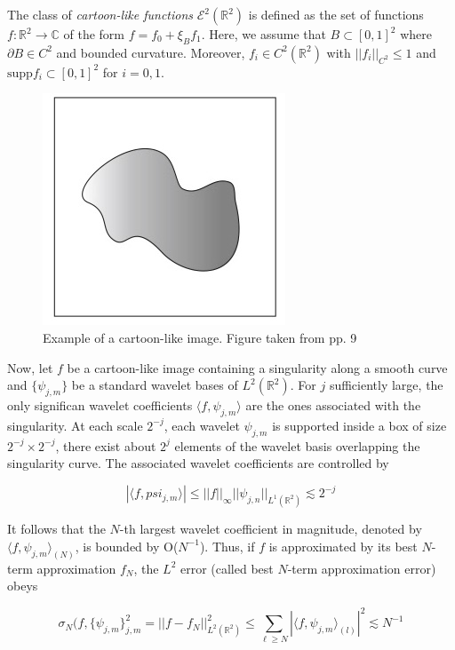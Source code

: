 \bigskip

\begin{defn}
The class of \textit{cartoon-like functions} $\mathcal{E}^2(\mathbb{R}^2)$ is defined as the set of functions $f:\mathbb{R}^2\longrightarrow \mathbb{C}$ of the form $f= f_0+\xi_B f_1$. Here, we assume that $B\subset [0,1]^2$ where $\partial B\in C^2$ and bounded curvature. Moreover, $f_i\in C^2(\mathbb{R}^2)$ with $||f_i||_{C^2}\leq 1$ and $\text{supp} f_i\subset [0,1]^2$ for $i=0,1$. 
\end{defn}

\bigskip

\begin{figure}[h!]
\centering
\includegraphics[width = 0.4 \textwidth]{./Diagrams/cartoon-like.jpg}
\caption{Example of a cartoon-like image. Figure taken from \cite{IntroShearlets} pp. 9}
\label{fig:cartoon-like}
\end{figure}

Now, let $f$ be a cartoon-like image containing a singularity along a smooth curve and $\{\psi_{j,m}\}$ be a standard wavelet bases of $L^2(\mathbb{R}^2)$. For $j$ sufficiently large, the only significan wavelet coefficients $\langle f,\psi_{ j,m}\rangle$ are the ones associated with the singularity. At each scale $2^{-j}$, each wavelet $\psi_{j,m}$ is supported inside a box of size $2^{-j}\times 2^{-j}$, there exist about $2^j$ elements of the wavelet basis overlapping the singularity curve. The associated wavelet coefficients are controlled by 

$$
|\langle f,	psi_{j,m}\rangle|\leq ||f||_{\infty}||\psi_{j,n}||_{L^1(\mathbb{R}^2)}\lesssim 2^{-j}
$$

It follows that the $N$-th largest wavelet coefficient in magnitude, denoted by $\langle f,\psi_{j,m}\rangle_{(N)}$, is bounded by O($N^{-1}$). Thus, if $f$ is approximated by its best $N$-term approximation $f_N$, the $L^2$ error (called  best $N$-term approximation error) obeys

$$
\sigma_N(f,\{\psi_{j,m}\}_{j,m}^2=||f-f_N||^2_{L^2(\mathbb{R}^2)}\leq \sum_{\ell\geq N}|\langle f,\psi_{j,m}\rangle_{(l)}|^2\lesssim N^{-1}
$$

